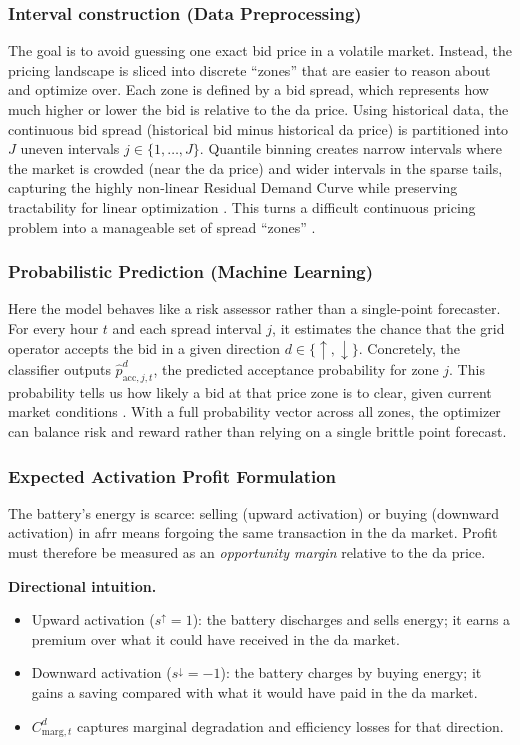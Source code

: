 \subsubsection{Interval construction (Data Preprocessing)}
The goal is to avoid guessing one exact bid price in a volatile market. Instead, the pricing landscape is sliced into discrete “zones” that are easier to reason about and optimize over. Each zone is defined by a bid spread, which represents how much higher or lower the bid is relative to the \gls{da} price. Using historical data, the continuous bid spread (historical bid minus historical \gls{da} price) is partitioned into $J$ uneven intervals $j\in\{1,\dots,J\}$. Quantile binning creates narrow intervals where the market is crowded (near the \gls{da} price) and wider intervals in the sparse tails, capturing the highly non-linear Residual Demand Curve \cite{aneiros2013functional} while preserving tractability for linear optimization \cite{abate2025bidding}. This turns a difficult continuous pricing problem into a manageable set of spread “zones” \cite{nolzen2022market}.

\subsubsection{Probabilistic Prediction (Machine Learning)}
Here the model behaves like a risk assessor rather than a single-point forecaster. For every hour $t$ and each spread interval $j$, it estimates the chance that the grid operator accepts the bid in a given direction $d\in\{\uparrow,\downarrow\}$. Concretely, the classifier outputs $\hat{p}_{\text{acc}, j, t}^{d}$, the predicted acceptance probability for zone $j$. This probability tells us how likely a bid at that price zone is to clear, given current market conditions \cite{koechlin2025strategic}. With a full probability vector across all zones, the optimizer can balance risk and reward rather than relying on a single brittle point forecast.

\subsubsection{Expected Activation Profit Formulation}
The battery’s energy is scarce: selling (upward activation) or buying (downward activation) in \gls{afrr} means forgoing the same transaction in the \gls{da} market. Profit must therefore be measured as an \emph{opportunity margin} relative to the \gls{da} price.

\textbf{Directional intuition.}
\begin{itemize}
    \item Upward activation ($s^{\uparrow}=1$): the battery discharges and sells energy; it earns a premium over what it could have received in the \gls{da} market.
    \item Downward activation ($s^{\downarrow}=-1$): the battery charges by buying energy; it gains a saving compared with what it would have paid in the \gls{da} market.
    \item $C_{\text{marg}, t}^{d}$ captures marginal degradation and efficiency losses for that direction.
\end{itemize}


